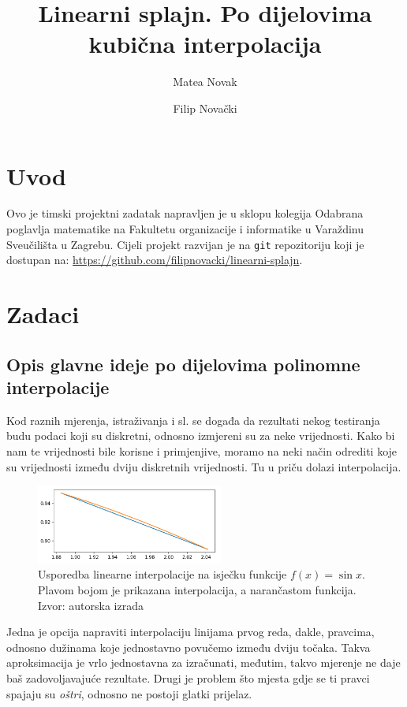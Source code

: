 \documentclass[12pt,a4paper]{report}
\author{Matea Novak \and Filip Novački}
\title{Linearni splajn. Po dijelovima kubična interpolacija}
\begin{document}
	\maketitle
	
	\tableofcontents
	
\chapter{Uvod}
	Ovo je timski projektni zadatak napravljen je u sklopu kolegija Odabrana poglavlja matematike na Fakultetu organizacije i informatike u Varaždinu Sveučilišta u Zagrebu. Cijeli projekt razvijan je na \texttt{git} repozitoriju koji je dostupan na: \url{https://github.com/filipnovacki/linearni-splajn}. 
\chapter{Zadaci}
	\section{Opis glavne ideje po dijelovima polinomne interpolacije}
	Kod raznih mjerenja, istraživanja i sl. se događa da rezultati nekog testiranja budu podaci koji su diskretni, odnosno izmjereni su za neke vrijednosti. Kako bi nam te vrijednosti bile korisne i primjenjive, moramo na neki način odrediti koje su vrijednosti između dviju diskretnih vrijednosti. Tu u priču dolazi interpolacija.
	
	\begin{figure}
		\includegraphics[width=0.55\textwidth]{slike/usporedba.png}
		\caption{Usporedba linearne interpolacije na isječku funkcije $f(x)=\sin x$. Plavom bojom je prikazana interpolacija, a narančastom funkcija. Izvor: autorska izrada}
		\label{usporedba}
	\end{figure}
	
	Jedna je opcija napraviti interpolaciju linijama prvog reda, dakle, pravcima, odnosno dužinama koje jednostavno povučemo između dviju točaka. Takva aproksimacija je vrlo jednostavna za izračunati, međutim, takvo mjerenje ne daje baš zadovoljavajuće rezultate\cite{ChEn2450}. Drugi je problem što mjesta gdje se ti pravci spajaju su \textit{oštri}, odnosno ne postoji glatki prijelaz.
	
\end{document}
